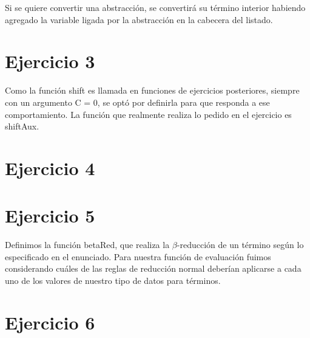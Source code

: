 \documentclass{article}
\begin{document}
	Si se quiere convertir una abstracción, se convertirá su término interior habiendo agregado la variable ligada por la abstracción en la cabecera del listado.
	
	
		
		\newpage
			
	\section*{Ejercicio 3}
	Como la función shift es llamada en funciones de ejercicios posteriores, siempre con un argumento C = 0, se optó por definirla para que responda a ese comportamiento. La función que realmente realiza lo pedido en el ejercicio es shiftAux.
		
	
	\section*{Ejercicio 4}
	
	
	\newpage
		
	\section*{Ejercicio 5}
	Definimos la función betaRed, que realiza la $\beta$-reducción de un término según lo especificado en el enunciado. Para nuestra función de evaluación fuimos considerando cuáles de las reglas de reducción normal deberían aplicarse a cada uno de los valores de nuestro tipo de datos para términos.
	
	
		
	\section*{Ejercicio 6}

	
	
	
\end{document}
